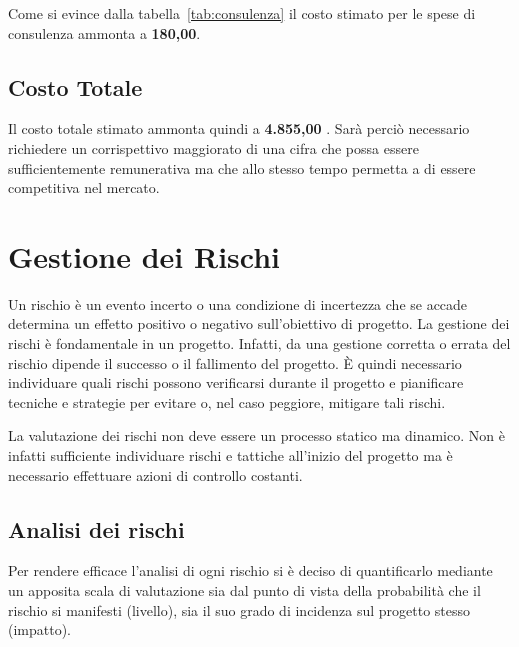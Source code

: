 Come si evince dalla tabella~\ref{tab:consulenza} il costo stimato per le spese di consulenza ammonta a \textbf{\text{\euro} 180,00}.

\subsection{Costo Totale}

Il costo totale stimato ammonta quindi a \textbf	{ \text{\euro} 4.855,00 }.
Sarà perciò necessario richiedere un corrispettivo maggiorato di una cifra che possa essere sufficientemente remunerativa ma che allo stesso tempo permetta a \team di essere competitiva nel mercato.


\section{Gestione dei Rischi}
Un rischio è un evento incerto o una condizione di incertezza che se accade determina un effetto positivo o negativo sull'obiettivo di progetto.
La gestione dei rischi è fondamentale in un progetto. Infatti, da una gestione corretta o errata del rischio dipende il successo o il fallimento del progetto.
È quindi necessario individuare quali rischi possono verificarsi durante il progetto e pianificare tecniche e strategie per evitare o, nel caso peggiore, mitigare tali rischi.

La valutazione dei rischi non deve essere un processo statico ma dinamico. Non è infatti sufficiente individuare rischi e tattiche all'inizio del progetto ma è necessario effettuare azioni di controllo costanti. 

\subsection{Analisi dei rischi}

\newcommand{\hi}{\textsc{alta}}
\newcommand{\lo}{\textsc{bassa}}
\newcommand{\med}{\textsc{media}}
Per rendere efficace l'analisi di ogni rischio si è deciso di quantificarlo mediante un apposita scala di valutazione sia dal punto di vista della probabilità che il rischio si manifesti (livello), sia il suo grado di incidenza sul progetto stesso (impatto).

